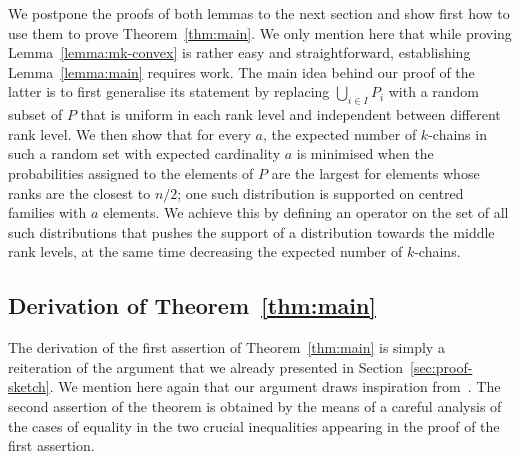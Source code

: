 \documentclass[11pt,a4paper,reqno]{amsart}
\numberwithin{claim}{thm}
\theoremstyle{definition}
\begin{document}
We postpone the proofs of both lemmas to the next section and show first how to use them to prove Theorem~\ref{thm:main}. We only mention here that while proving Lemma~\ref{lemma:mk-convex} is rather easy and straightforward, establishing Lemma~\ref{lemma:main} requires work. The main idea behind our proof of the latter is to first generalise its statement by replacing $\bigcup_{i \in I} P_i$ with a random subset of $P$ that is uniform in each rank level and independent between different rank level. We then show that for every $a$, the expected number of $k$-chains in such a random set with expected cardinality $a$ is minimised when the probabilities assigned to the elements of $P$ are the largest for elements whose ranks are the closest to $n/2$; one such distribution is supported on centred families with $a$ elements. We achieve this by defining an operator on the set of all such distributions that pushes the support of a distribution towards the middle rank levels, at the same time decreasing the expected number of $k$-chains.

\subsection{Derivation of Theorem~\ref{thm:main}}
\label{sec:derivation-theorem}

The derivation of the first assertion of Theorem~\ref{thm:main} is simply a reiteration of the argument that we already presented in Section~\ref{sec:proof-sketch}. We mention here again that our argument draws inspiration from~\cite[Lemma~2.2]{NoScSu}. The second assertion of the theorem is obtained by the means of a careful analysis of the cases of equality in the two crucial inequalities appearing in the proof of the first assertion.
\end{document}
